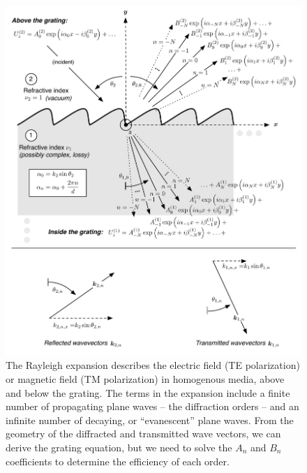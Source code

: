 \begin{figure}[htbp] %
   \centering
   \includegraphics[width=\aFigureWidth]{../data/Chapter2/2b_rayleighExpansion/2b.pdf} 
   \caption[The Rayleigh expansion describes the electric field (TE polarization) or magnetic field (TM polarization) in homogenous media, above and below the grating.]{The Rayleigh expansion describes the electric field (TE polarization) or magnetic field (TM polarization) in homogenous media, above and below the grating.  The terms in the expansion include a finite number of propagating plane waves -- the diffraction orders -- and an infinite number of decaying, or ``evanescent'' plane waves. From the geometry of the diffracted and transmitted wave vectors, we can derive the grating equation, but we need to solve the $A_n$ and $B_n$ coefficients to determine the efficiency of each order. }
   \label{2b}
\end{figure}

